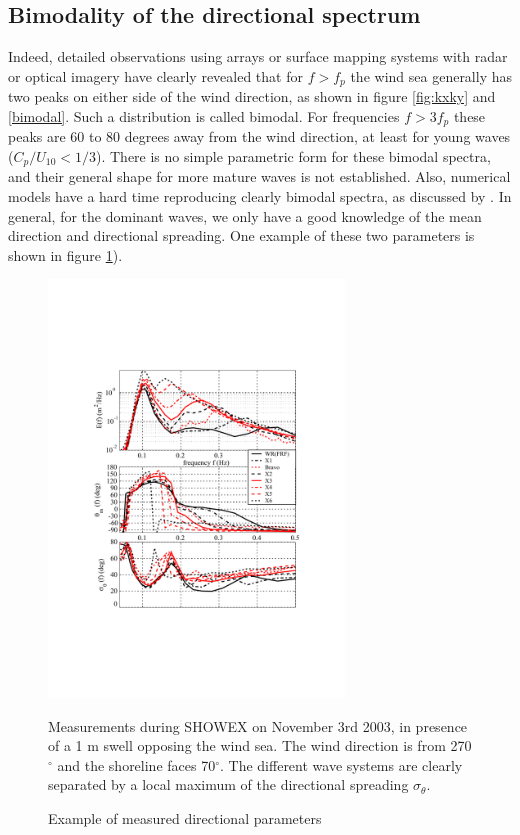 \subsection{Bimodality of the directional spectrum}
Indeed, detailed observations using arrays \citep{Young&al.1995,Long&Resio2007} or surface mapping systems with radar or optical imagery 
\citep{Hwang&al.2000b,Romero&Melville2010,Leckler&al.2015} have clearly revealed that for  $f > f_p$ the wind sea generally has two peaks 
on either side of the wind direction, as shown in figure 
\ref{fig:kxky} and \ref{bimodal}. Such a distribution is called bimodal. For frequencies $f>3f_p$ these peaks are 60 to 80 degrees 
away from the wind direction, at least for young waves ($C_p/U_{10} < 1/3$). 
There is no simple parametric form for these bimodal spectra, and their general shape for more mature waves is not established. 
Also, numerical models have a hard time reproducing clearly bimodal spectra, as discussed by \cite{Alves&Banner2003}. In general, for the dominant waves, we only have a good knowledge of the mean direction and directional spreading. 
One example of these two parameters is shown in figure \ref{fig_SHOWEX_dir}).
\begin{figure}[htb]
\centerline{\includegraphics[width=0.7\textwidth]{FIGS_CH_FETCH/showex_spectra_dir.pdf}}
  \caption{Example of measured directional parameters}{Measurements during SHOWEX on November 3rd 2003, in presence of a 1 m swell opposing 
the wind sea. The wind direction is from 270$^\circ$ and the shoreline faces 70$^\circ$. 
The different wave systems are clearly separated by a local maximum of the directional spreading 
  $\sigma_\theta$}.
\label{fig_SHOWEX_dir}
\end{figure}

